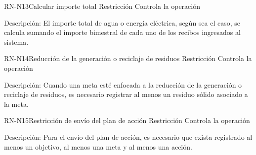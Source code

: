 \begin{BusinessRule}{RN-N13}{Calcular importe total}
    {Restricción}
    {Controla la operación}
    \item[Descripción:] El importe total de agua o energía eléctrica, según sea el caso, se calcula sumando el importe bimestral de cada uno de los recibos ingresados al sistema.
\end{BusinessRule}
\begin{BusinessRule}{RN-N14}{Reducción de la generación o reciclaje de residuos}
    {Restricción}
    {Controla la operación}
    \item[Descripción:] Cuando una meta esté enfocada a la reducción de la generación o reciclaje de residuos, es necesario registrar al menos un residuo sólido asociado a la meta.
\end{BusinessRule}
\begin{BusinessRule}{RN-N15}{Restricción de envío del plan de acción}
    {Restricción}
    {Controla la operación}
    \item[Descripción:] Para el envío del plan de acción, es necesario que exista registrado al menos un objetivo, al menos una meta y al menos una acción.
\end{BusinessRule}

